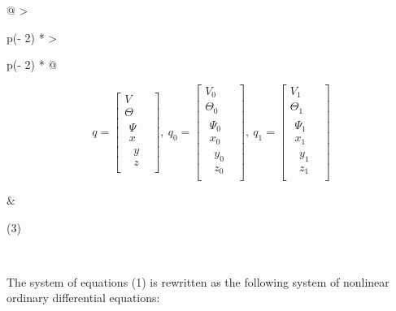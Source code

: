 \begin{longtable}[]{@{}
  >{\raggedright\arraybackslash}p{(\columnwidth - 2\tabcolsep) * }
  >{\raggedright\arraybackslash}p{(\columnwidth - 2\tabcolsep) * }@{}}
\toprule\noalign{}
\begin{minipage}[b]{\linewidth}\raggedright
\[q = \begin{bmatrix}
V \\
\Theta \\
\begin{matrix}
\Psi \\
x \\
\begin{matrix}
y \\
z
\end{matrix}
\end{matrix}
\end{bmatrix},\ q_{0} = \begin{bmatrix}
V_{0} \\
\Theta_{0} \\
\begin{matrix}
\Psi_{0} \\
x_{0} \\
\begin{matrix}
y_{0} \\
z_{0}
\end{matrix}
\end{matrix}
\end{bmatrix},\ q_{1} = \begin{bmatrix}
V_{1} \\
\Theta_{1} \\
\begin{matrix}
\Psi_{1} \\
x_{1} \\
\begin{matrix}
y_{1} \\
z_{1}
\end{matrix}
\end{matrix}
\end{bmatrix}\]
\end{minipage} & \begin{minipage}[b]{\linewidth}\raggedright
(3)
\end{minipage} \\
\midrule\noalign{}
\endhead
\bottomrule\noalign{}
\endlastfoot
\end{longtable}

The system of equations (1) is rewritten as the following system of
nonlinear ordinary differential equations:

